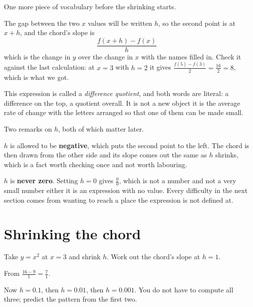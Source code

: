 \begin{fr}
One more piece of vocabulary before the shrinking starts.

The gap between the two $x$ values will be written $h$, so the second point is
at $x + h$, and the chord's slope is
\[ \frac{f(x + h) - f(x)}{h} \]
which is the change in $y$ over the change in $x$ with the names filled in.
Check it against the last calculation: at $x = 3$ with $h = 2$ it gives
$\frac{f(5) - f(3)}{2} = \frac{16}{2} = 8$, which is what we got.

\begin{note}
This expression is called a \emph{difference quotient}, and both words are
literal: a difference on the top, a quotient overall. It is not a new object
\dash{} it is the average rate of change with the letters arranged so that
one of them can be made small.
\end{note}
\end{fr}

\begin{fr}
Two remarks on $h$, both of which matter later.

$h$ is allowed to be \textbf{negative}, which puts the second point to the
left. The chord is then drawn from the other side and its slope comes out the
same as $h$ shrinks, which is a fact worth checking once and not worth
labouring.

$h$ is \textbf{never zero}. Setting $h = 0$ gives $\frac{0}{0}$, which is not
a number and not a very small number either \dash{} it is an expression with
no value. Every difficulty in the next section comes from wanting to reach a
place the expression is not defined at.
\end{fr}

\section{Shrinking the chord}
\label{sec:F11-shrinking}

\begin{fr}
Take $y = x^{2}$ at $x = 3$ and shrink $h$. Work out the chord's slope at
$h = 1$.
\nextframe
\end{fr}

\begin{fr}
From $\frac{16 - 9}{1} = \frac{7}{1}$.

Now $h = \num{0.1}$, then $h = \num{0.01}$, then $h = \num{0.001}$. You do not
have to compute all three; predict the pattern from the first two.
\dotline
\nextframe
\end{fr}


